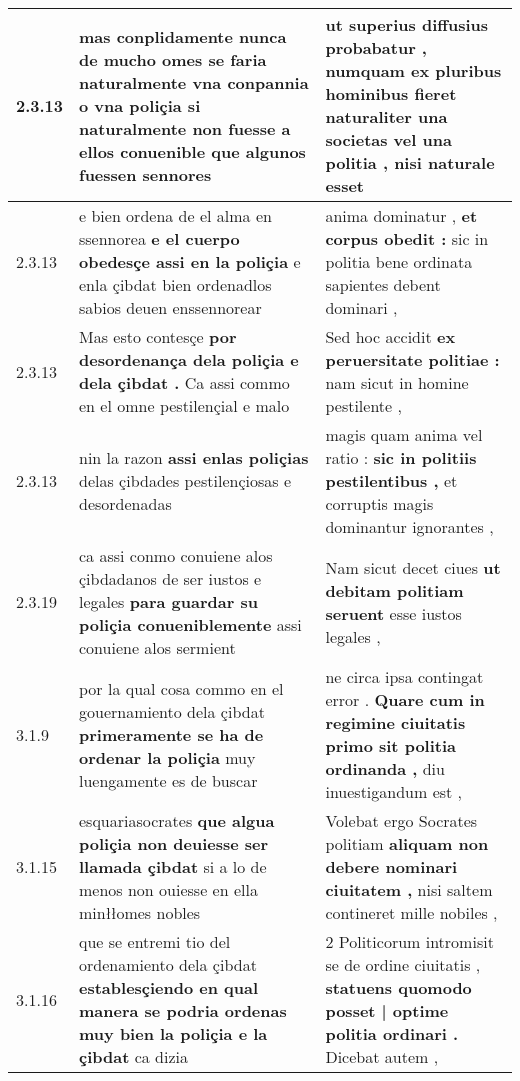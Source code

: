 \begin{tabular}{|p{1cm}|p{6.5cm}|p{6.5cm}|}

\hline
2.3.13 & mas conplidamente nunca de mucho omes se faria naturalmente \textbf{ vna conpannia o vna poliçia } si naturalmente non fuesse a ellos conuenible que algunos fuessen sennores & ut superius diffusius probabatur , \textbf{ numquam ex pluribus hominibus fieret naturaliter una societas vel una politia , } nisi naturale esset \\\hline
2.3.13 & e bien ordena de el alma en ssennorea \textbf{ e el cuerpo obedesçe assi en la poliçia } e enla çibdat bien ordenadlos sabios deuen enssennorear & anima dominatur , \textbf{ et corpus obedit : } sic in politia bene ordinata sapientes debent dominari , \\\hline
2.3.13 & Mas esto contesçe \textbf{ por desordenança dela poliçia e dela çibdat . } Ca assi commo en el omne pestilençial e malo & Sed hoc accidit \textbf{ ex peruersitate politiae : } nam sicut in homine pestilente , \\\hline
2.3.13 & nin la razon \textbf{ assi enlas poliçias } delas çibdades pestilençiosas e desordenadas & magis quam anima vel ratio : \textbf{ sic in politiis pestilentibus , } et corruptis magis dominantur ignorantes , \\\hline
2.3.19 & ca assi conmo conuiene alos çibdadanos de ser iustos e legales \textbf{ para guardar su poliçia conueniblemente } assi conuiene alos sermient & Nam sicut decet ciues \textbf{ ut debitam politiam seruent } esse iustos legales , \\\hline
3.1.9 & por la qual cosa commo en el gouernamiento dela çibdat \textbf{ primeramente se ha de ordenar la poliçia } muy luengamente es de buscar & ne circa ipsa contingat error . \textbf{ Quare cum in regimine ciuitatis primo sit politia ordinanda , } diu inuestigandum est , \\\hline
3.1.15 & esquariasocrates \textbf{ que algua poliçia non deuiesse ser llamada çibdat } si a lo de menos non ouiesse en ella minłłomes nobles & Volebat ergo Socrates politiam \textbf{ aliquam non debere nominari ciuitatem , } nisi saltem contineret mille nobiles , \\\hline
3.1.16 & que se entremi tio del ordenamiento dela çibdat \textbf{ establesçiendo en qual manera se podria ordenas muy bien la poliçia e la çibdat } ca dizia & 2 Politicorum intromisit se de ordine ciuitatis , \textbf{ statuens quomodo posset | optime politia ordinari . } Dicebat autem , \\\hline

\end{tabular}
